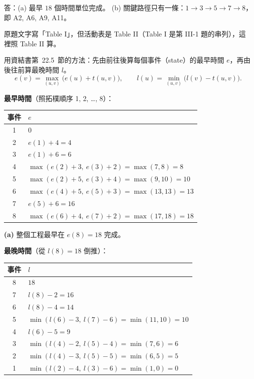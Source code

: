 \begin{pastsoln}
答：(a) 最早 $18$ 個時間單位完成。 (b) 關鍵路徑只有一條：$1 \to 3 \to 5 \to 7 \to 8$，即 A2, A6, A9, A11。

原題文字寫「Table I」，但活動表是 Table II（Table I 是第 III-1 題的串列），這裡照 Table II 算。

用資結書第~22.5~節的方法：先由前往後算每個事件（state）的最早時間 $e$，再由後往前算最晚時間 $l$。
\[
e(v) = \max_{(u, v)} \bigl(e(u) + t(u, v)\bigr), \qquad l(u) = \min_{(u, v)} \bigl(l(v) - t(u, v)\bigr).
\]

\textbf{最早時間}（照拓樸順序 1, 2, \dots, 8）：
\begin{center}
\small
\begin{tabular}{cl}
\toprule
事件 & $e$ \\
\midrule
1 & $0$ \\
2 & $e(1) + 4 = 4$ \\
3 & $e(1) + 6 = 6$ \\
4 & $\max(e(2) + 3,\ e(3) + 2) = \max(7, 8) = 8$ \\
5 & $\max(e(2) + 5,\ e(3) + 4) = \max(9, 10) = 10$ \\
6 & $\max(e(4) + 5,\ e(5) + 3) = \max(13, 13) = 13$ \\
7 & $e(5) + 6 = 16$ \\
8 & $\max(e(6) + 4,\ e(7) + 2) = \max(17, 18) = 18$ \\
\bottomrule
\end{tabular}
\end{center}
\textbf{(a)} 整個工程最早在 $e(8) = 18$ 完成。

\textbf{最晚時間}（從 $l(8) = 18$ 倒推）：
\begin{center}
\small
\begin{tabular}{cl}
\toprule
事件 & $l$ \\
\midrule
8 & $18$ \\
7 & $l(8) - 2 = 16$ \\
6 & $l(8) - 4 = 14$ \\
5 & $\min(l(6) - 3,\ l(7) - 6) = \min(11, 10) = 10$ \\
4 & $l(6) - 5 = 9$ \\
3 & $\min(l(4) - 2,\ l(5) - 4) = \min(7, 6) = 6$ \\
2 & $\min(l(4) - 3,\ l(5) - 5) = \min(6, 5) = 5$ \\
1 & $\min(l(2) - 4,\ l(3) - 6) = \min(1, 0) = 0$ \\
\bottomrule
\end{tabular}
\end{center}


\end{pastsoln}
